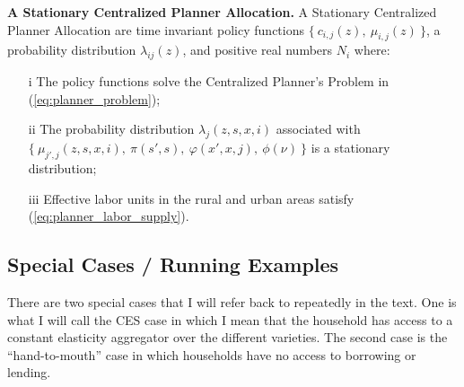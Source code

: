 \documentclass[12pt,pdftex]{article}
\begin{document}
\begin{onehalfspacing}
\textbf{A Stationary Centralized Planner Allocation.}  A Stationary Centralized Planner Allocation are time invariant policy functions $\{\ c_{i,j}(z),\ \mu_{i,j}(z) \ \}$, a probability distribution $\lambda_{ij}(z)$, and positive real numbers $N_{i}$ where:
\begin{itemize}
\item[i] The policy functions solve the Centralized Planner's Problem in (\ref{eq:planner_problem});
\item[ii] The probability distribution $\lambda_{j}(z, s, x, i)$ associated with $\{\ \mu_{j',j}(z, s, x, i), \ \pi(s',s), \ \varphi(x',x, j), \ \phi(\nu) \ \}$ is a stationary distribution;
\item[iii] Effective labor units in the rural and urban areas satisfy (\ref{eq:planner_labor_supply}).
\end{itemize}





\subsection{Special Cases / Running Examples}

There are two special cases that I will refer back to repeatedly in the text. One is what I will call the CES case in which I mean that the household has access to a constant elasticity aggregator over the different varieties. The second case is the ``hand-to-mouth'' case in which households have no access to borrowing or lending.


\end{onehalfspacing}
\end{document}

